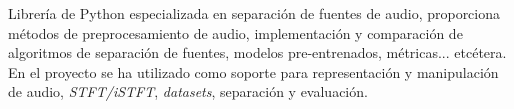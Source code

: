 Librería de Python especializada en separación de fuentes de audio, proporciona métodos de preprocesamiento de audio, implementación y comparación de algoritmos de separación de fuentes, modelos pre-entrenados, métricas... etcétera. En el proyecto se ha utilizado como soporte para representación y manipulación de audio, \textit{STFT/iSTFT}, \textit{datasets}, separación y evaluación.